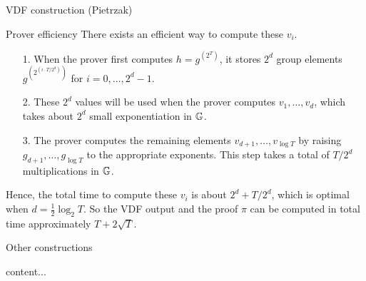 \documentclass[UTF8]{beamer}
\begin{document}
	\begin{frame}{VDF construction (Pietrzak)}
		\begin{block}{Prover efficiency}
			There exists an efficient way to compute these $v_i$.
			\begin{enumerate}
				\item [1.] When the prover first computes $h=g^{(2^T)}$, it stores $2^d$ group elements $g^{(2^{(i\cdot T/2^d)})}$ for $i=0,\dots,2^d-1$.
				\item [2.] These $2^d$ values will be used when the prover computes $v_1,\dots,v_d$, which takes about $2^d$ small exponentiation in $\mathbb{G}$.
				\item [3.] The prover computes the remaining elements $v_{d+1},\dots,v_{\log T}$ by raising $g_{d+1},\dots,g_{\log T}$ to the appropriate exponents. This step takes a total of $T/2^d$ multiplications in $\mathbb{G}$.
			\end{enumerate}
			Hence, the total time to compute these $v_i$ is about $2^d+T/2^d$, which is optimal when $d=\frac{1}{2}\log_2 T$. So the VDF output and the proof $\pi$ can be computed in total time approximately $T+2\sqrt{T}$.
		\end{block}
	\end{frame}

	\begin{frame}{Other constructions}
		\begin{block}{}
			content...
		\end{block}
	\end{frame}
\end{document}
